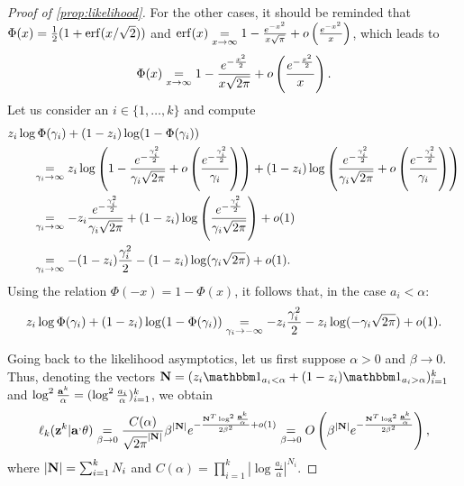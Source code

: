 \begin{proof}[Proof of \cref{prop:likelihood}]
For the other cases, it should be reminded that $\Phi(x)=\frac{1}{2}(1+\operatorname{erf}(x/\sqrt{2}))$ and $\operatorname{erf}(x)\overset{}{\underset{x\rightarrow\infty}{=}}1-\frac{e^{-x^2}}{x\sqrt{\pi}} + o\left(\frac{e^{-x^2}}{x}\right)$, which leads to 
    \begin{equation}\label{eq:Jasymp:phiasymp}
        \Phi(x)\overset{}{\underset{x\rightarrow\infty}{=}}1 - \frac{e^{-\frac{x^2}{2}}}{x\sqrt{2\pi}} + o\left(\frac{e^{-\frac{x^2}{2}}}{x}\right).
    \end{equation}
Let us consider an $i\in\{1,\dots,k\}$ and compute
\begin{equation}
    \begin{aligned}
        &z_i\log\Phi(\gamma_i) + (1-z_i)\log(1-\Phi(\gamma_i)) \\
           &\qquad  \aseq{\gamma_i\rightarrow\infty} z_i\log\left(1-\frac{e^{-\frac{\gamma_i^2}{2}}}{\gamma_i\sqrt{2\pi}} + o\left(\frac{e^{-\frac{\gamma_i^2}{2}}}{\gamma_i}\right)\right)
          +(1-z_i)\log\left(\frac{e^{-\frac{\gamma_i^2}{2}}}{\gamma_i\sqrt{2\pi}} + o\left(\frac{e^{-\frac{\gamma_i^2}{2}}}{\gamma_i}\right)\right)\\
           &\qquad \aseq{\gamma_i\rightarrow\infty} -z_i\frac{e^{-\frac{\gamma_i^2}{2}}}{\gamma_i\sqrt{2\pi}}  %
                +(1-z_i)\log\left(\frac{e^{-\frac{\gamma_i^2}{2}}}{\gamma_i\sqrt{2\pi}}\right) + o(1)\\
           &\qquad \aseq{\gamma_i\rightarrow\infty} - (1-z_i)\frac{\gamma_i^2}{2} - (1-z_i)\log(\gamma_i\sqrt{2\pi}) + o(1).
    \end{aligned}
\end{equation}
Using the relation $\Phi(-x)=1-\Phi(x)$, it follows that, in the case $a_i<\alpha$:
    \begin{equation}
        z_i\log\Phi(\gamma_i) + (1-z_i)\log(1-\Phi(\gamma_i))
            \overset{}{\underset{\gamma_i\rightarrow-\infty}{=}} - z_i\frac{\gamma_i^2}{2} - z_i\log(-\gamma_i\sqrt{2\pi}) + o(1).
    \end{equation}

{
Going back to the likelihood asymptotics, let us first suppose $\alpha>0$ and $\beta\to0$. Thus, denoting the vectors $\mbf N=(z_i\indic_{a_i<\alpha}+(1-z_i)\indic_{a_i>\alpha})_{i=1}^k$ and 
$\log^2\frac{\mathbf{a}^k}{\alpha}=(\log^2\frac{a_i}{\alpha})_{i=1}^k$, we obtain
    \begin{equation}
        \ell_k(\mbf z^k|\mbf a^,\theta) \aseq{\beta\rightarrow0} \frac{C(\alpha)}{\sqrt{2\pi}^{|\mbf N|}}\beta^{|\mbf N|} e^{-\frac{\mbf N^T\log^2\frac{\mbf a^k}{\alpha}}{2\beta^2}+o(1)} %
            \aseq{\beta\rightarrow0}O\left(\beta^{|\mbf N|}e^{-\frac{\mbf N^T\log^2\frac{\mbf a^k}{\alpha}}{2\beta^2}}\right) ,
    \end{equation}
where $|\mathbf{N}|=\sum_{i=1}^kN_i$ and $C(\alpha) =\prod_{i=1}^k\left|\log\frac{a_i}{\alpha}\right|^{N_i}$. %

}
\end{proof}
